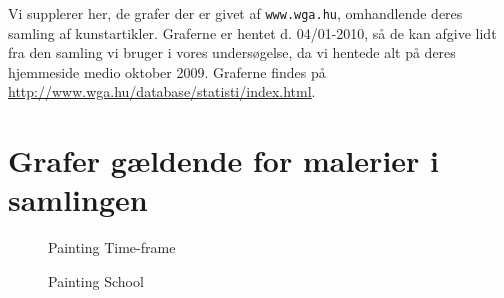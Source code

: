 {
Vi supplerer her, de grafer der er givet af \texttt{www.wga.hu}, omhandlende
deres samling af kunstartikler. Graferne er hentet d. 04/01-2010, så de kan
afgive lidt fra den samling vi bruger i vores undersøgelse, da vi hentede alt
på deres hjemmeside medio oktober 2009. Graferne findes på
\href{http://www.wga.hu/database/statisti/index.html}{http://www.wga.hu/database/statisti/index.html}.

\section{Grafer gældende for malerier i samlingen}
\begin{figure}[H]
    \setlength\fboxsep{0pt}
    \setlength\fboxrule{0.5pt}
    \centering
    \caption[]{Painting Time-frame}
    \label{painting_timeframe}
\end{figure}

\begin{figure}[H]
    \setlength\fboxsep{0pt}
    \setlength\fboxrule{0.5pt}
    \centering
    \caption[]{Painting School}
    \label{painting_school}
\end{figure}

}
